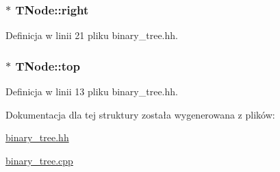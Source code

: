 \hypertarget{struct_t_node_a6b5dd12f769d27a03be38706ea41e129}{
\subsubsection[{right}]{$\ast$ T\-Node\-::right}}\label{struct_t_node_a6b5dd12f769d27a03be38706ea41e129}


Definicja w linii 21 pliku binary\-\_\-tree.\-hh.

\hypertarget{struct_t_node_a17c4c510a01bba35b600f8f1f9dec97c}{
\subsubsection[{top}]{$\ast$ T\-Node\-::top}}\label{struct_t_node_a17c4c510a01bba35b600f8f1f9dec97c}


Definicja w linii 13 pliku binary\-\_\-tree.\-hh.



Dokumentacja dla tej struktury została wygenerowana z plików\-:\begin{DoxyCompactItemize}
\item 
\hyperlink{binary__tree_8hh}{binary\-\_\-tree.\-hh}\item 
\hyperlink{binary__tree_8cpp}{binary\-\_\-tree.\-cpp}\end{DoxyCompactItemize}
